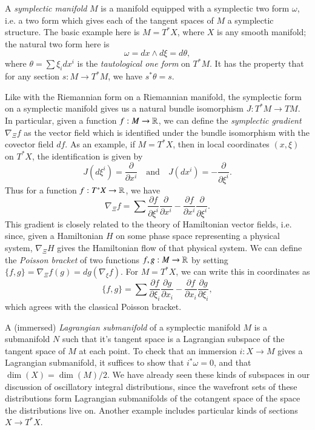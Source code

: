 A \emph{symplectic manifold} $M$ is a manifold equipped with a symplectic two form $\omega$, i.e. a two form which gives each of the tangent spaces of $M$ a symplectic structure. The basic example here is $M = T^* X$, where $X$ is any smooth manifold; the natural two form here is
%
\[ \omega = dx \wedge d\xi = d \theta, \]
%
where $\theta = \sum \xi_i dx^i$ is the \emph{tautological one form} on $T^* M$. It has the property that for any section $s: M \to T^* M$, we have $s^* \theta = s$.

Like with the Riemannian form on a Riemannian manifold, the symplectic form on a symplectic manifold gives us a natural bundle isomorphism $J: T^*M \to TM$. In particular, given a function $f : M \to \operatorname{\mathbb{R}}$, we can define the \emph{symplectic gradient} $\nabla_{\Xi} f$ as the vector field which is identified under the bundle isomorphism with the covector field $df$. As an example, if $M = T^* X$, then in local coordinates $(x,\xi)$ on $T^* X$, the identification is given by
%
\[ J(d\xi^i) = \frac{\partial}{\partial x^i} \quad\text{and}\quad J \left( dx^i \right) = - \frac{\partial}{\partial \xi^i}. \]
%
Thus for a function $f: T^* X \to \operatorname{\mathbb{R}}$, we have
%
\[ \nabla_{\Xi} f = \sum \frac{\partial f}{\partial \xi^i} \frac{\partial}{\partial x^i} - \frac{\partial f}{\partial x^i} \frac{\partial}{\partial \xi^i}. \]
%
This gradient is closely related to the theory of Hamiltonian vector fields, i.e. since, given a Hamiltonian $H$ on some phase space representing a physical system, $\nabla_{\Xi} H$ gives the Hamiltonian flow of that physical system. We can define the \emph{Poisson bracket} of two functions $f,g: M \to \operatorname{\mathbb{R}}$ by setting $\{ f, g \} = \nabla_\Xi f (g) = dg ( \nabla_\xi f)$. For $M = T^* X$, we can write this in coordinates as
%
\[ \{ f, g \} = \sum \frac{\partial f}{\partial \xi_i} \frac{\partial g}{\partial x_i} - \frac{\partial f}{\partial x_i} \frac{\partial g}{\partial \xi_i}, \]
%
which agrees with the classical Poisson bracket.

A (immersed) \emph{Lagrangian submanifold} of a symplectic manifold $M$ is a submanifold $N$ such that it's tangent space is a Lagrangian subspace of the tangent space of $M$ at each point. To check that an immersion $i: X \to M$ gives a Lagrangian submanifold, it suffices to show that $i^* \omega = 0$, and that $\dim(X) = \dim(M)/2$. We have already seen these kinds of subspaces in our discussion of oscillatory integral distributions, since the wavefront sets of these distributions form Lagrangian submanifolds of the cotangent space of the space the distributions live on. Another example includes particular kinds of sections $X \to T^* X$.

